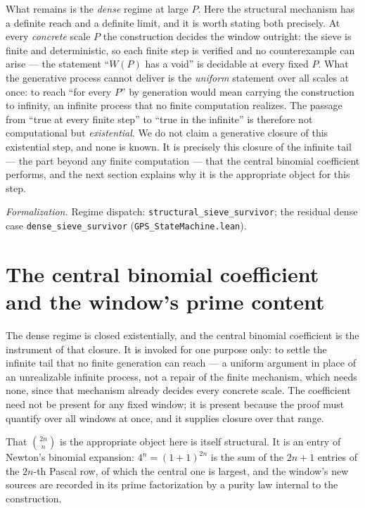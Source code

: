 \documentclass[11pt,a4paper]{amsart}
\theoremstyle{plain}
\theoremstyle{definition}
\theoremstyle{plain}
\theoremstyle{remark}
\newcommand{\lean}[1]{\textup{\texttt{#1}}}
\newcommand{\Formal}[1]{\par\smallskip\noindent\emph{Formalization.} #1\par\smallskip}
\begin{document}
What remains is the \emph{dense} regime at large $P$. Here the structural mechanism has a
definite reach and a definite limit, and it is worth stating both precisely. At every
\emph{concrete} scale $P$ the construction decides the window outright: the sieve is
finite and deterministic, so each finite step is verified and no counterexample can arise
--- the statement \enquote{$W(P)$ has a void} is decidable at every fixed $P$. What the
generative process cannot deliver is the \emph{uniform} statement over all scales at once:
to reach \enquote{for every $P$} by generation would mean carrying the construction to
infinity, an infinite process that no finite computation realizes. The passage from
\enquote{true at every finite step} to \enquote{true in the infinite} is therefore not
computational but \emph{existential}. We do not claim a generative closure of this
existential step, and none is known. It is precisely this closure of the infinite tail ---
the part beyond any finite computation --- that the central binomial coefficient performs, and
the next section explains why it is the appropriate object for this step.

\Formal{Regime dispatch: \lean{structural\_sieve\_survivor}; the residual dense case
\lean{dense\_sieve\_survivor} (\lean{GPS\_StateMachine.lean}).}

\section{The central binomial coefficient and the window's prime content}
\label{sec:newton}

The dense regime is closed existentially, and the central binomial coefficient is the
instrument of that closure. It is invoked for one purpose only: to settle the infinite tail
that no finite generation can reach --- a uniform argument in place of an unrealizable infinite
process, not a repair of the finite mechanism, which needs none, since that mechanism already
decides every concrete scale. The coefficient need not be present for any fixed window; it is
present because the proof must quantify over all windows at once, and it supplies closure over
that range.

That $\binom{2n}{n}$ is the appropriate object here is itself structural. It is an entry of
Newton's binomial expansion: $4^n=(1+1)^{2n}$ is the sum of the $2n+1$ entries of the $2n$-th
Pascal row, of which the central one is largest, and the window's new sources are recorded in
its prime factorization by a purity law internal to the construction.
\end{document}
